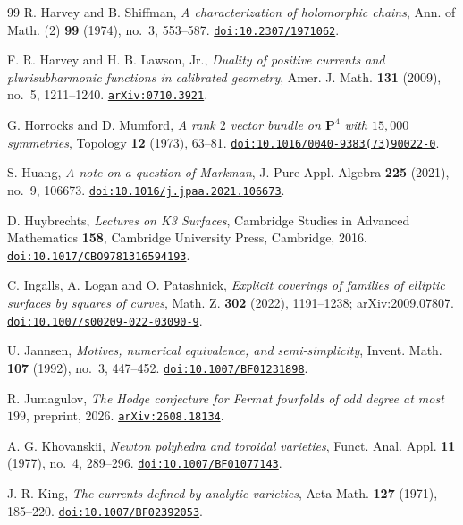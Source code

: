 \begin{thebibliography}{99}
R. Harvey and B. Shiffman,
\emph{A characterization of holomorphic chains},
Ann. of Math. (2) \textbf{99} (1974), no.~3, 553--587.
\href{https://doi.org/10.2307/1971062}{\texttt{doi:10.2307/1971062}}.

F. R. Harvey and H. B. Lawson, Jr.,
\emph{Duality of positive currents and plurisubharmonic functions in
calibrated geometry},
Amer. J. Math. \textbf{131} (2009), no.~5, 1211--1240.
\href{https://arxiv.org/abs/0710.3921}{\texttt{arXiv:0710.3921}}.

G. Horrocks and D. Mumford,
\emph{A rank $2$ vector bundle on $\mathbf{P}^{4}$ with $15{,}000$ symmetries},
Topology \textbf{12} (1973), 63--81.
\href{https://doi.org/10.1016/0040-9383(73)90022-0}{\texttt{doi:10.1016/0040-9383(73)90022-0}}.

S. Huang,
\emph{A note on a question of Markman},
J. Pure Appl. Algebra \textbf{225} (2021), no.~9, 106673.
\href{https://doi.org/10.1016/j.jpaa.2021.106673}{\texttt{doi:10.1016/j.jpaa.2021.106673}}.

D. Huybrechts,
\emph{Lectures on K3 Surfaces},
Cambridge Studies in Advanced Mathematics \textbf{158},
Cambridge University Press, Cambridge, 2016.
\href{https://doi.org/10.1017/CBO9781316594193}{\texttt{doi:10.1017/CBO9781316594193}}.

C. Ingalls, A. Logan and O. Patashnick,
\emph{Explicit coverings of families of elliptic surfaces by squares of
curves},
Math. Z. \textbf{302} (2022), 1191--1238; arXiv:2009.07807.
\href{https://doi.org/10.1007/s00209-022-03090-9}{\texttt{doi:10.1007/s00209-022-03090-9}}.

U. Jannsen,
\emph{Motives, numerical equivalence, and semi-simplicity},
Invent. Math. \textbf{107} (1992), no.~3, 447--452.
\href{https://doi.org/10.1007/BF01231898}{\texttt{doi:10.1007/BF01231898}}.

R. Jumagulov,
\emph{The Hodge conjecture for Fermat fourfolds of odd degree at most
$199$},
preprint, 2026.
\href{https://arxiv.org/abs/2608.18134}{\texttt{arXiv:2608.18134}}.

A. G. Khovanskii,
\emph{Newton polyhedra and toroidal varieties},
Funct. Anal. Appl. \textbf{11} (1977), no.~4, 289--296.
\href{https://doi.org/10.1007/BF01077143}{\texttt{doi:10.1007/BF01077143}}.

J. R. King,
\emph{The currents defined by analytic varieties},
Acta Math. \textbf{127} (1971), 185--220.
\href{https://doi.org/10.1007/BF02392053}{\texttt{doi:10.1007/BF02392053}}.


\end{thebibliography}
